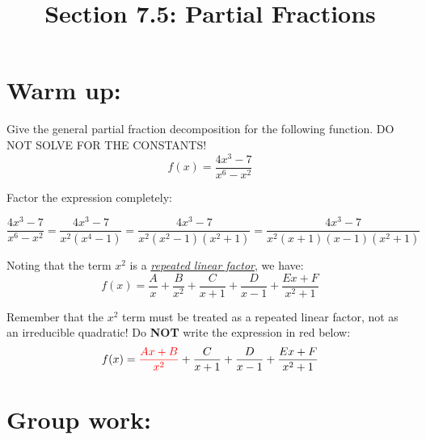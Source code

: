 \documentclass[noinstructornotes]{ximera}
\title{Section 7.5: Partial Fractions}
\begin{document}
\begin{abstract}		\end{abstract}
\maketitle



\section{Warm up:}
\begin{problem}
Give the general partial fraction decomposition for the following function.  DO NOT SOLVE FOR THE CONSTANTS! $$f(x) = \dfrac{4x^3-7}{x^6-x^2}$$

\begin{freeResponse}
	Factor the expression completely:

$$ \dfrac{4x^3-7}{x^6-x^2}= \dfrac{4x^3-7}{x^2(x^4-1)} = \dfrac{4x^3-7}{x^2(x^2-1)(x^2+1)} =\dfrac{4x^3-7}{x^2(x+1)(x-1)(x^2+1)}$$

\vspace{2mm}

Noting that the term $x^2$ is a \emph{\underline{repeated linear factor}}, we have:
$$\boxed{f(x) = \dfrac{A}{x}+\dfrac{B}{x^2}+\dfrac{C}{x+1} +\dfrac{D}{x-1} + \dfrac{Ex+F}{x^2+1}}$$
	
\end{freeResponse}

\end{problem}	

Remember that the $x^2$ term must be treated as a repeated linear factor, not as an irreducible quadratic!  Do \textbf{NOT} write the expression in \color{red} red  below\color{black}: $$f(x) = \color{red} \dfrac{Ax+B}{x^2} \color{black}+\dfrac{C}{x+1} +\dfrac{D}{x-1} + \dfrac{Ex+F}{x^2+1}$$







\section{Group work:}
\end{document}
